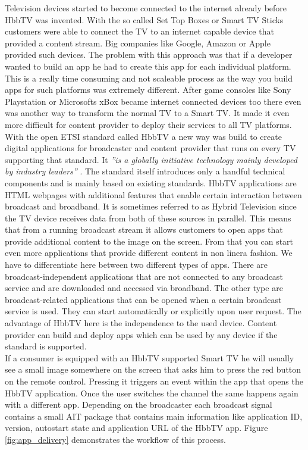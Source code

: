 Television devices started to become connected to the internet already before HbbTV was invented. With
the so called Set Top Boxes or Smart TV Sticks customers were able to connect the TV to an internet
capable device that provided a content stream. Big companies like Google, Amazon or Apple provided such
devices. The problem with this approach was that if a developer wanted to build an app he had to create
this app for each individual platform. This is a really time consuming and not scaleable process as
the way you build apps for such platforms was extremely different. After game consoles like Sony Playstation
or Microsofts xBox became internet connected devices too there even was another way to transform
the normal TV to a Smart TV. It made it even more difficult for content provider to deploy their services
to all TV platforms.\\
With the open ETSI standard called HbbTV a new way was build to create digital applications for
broadcaster and content provider that runs on every TV supporting that standard. It \textit{''is
a globally initiative technology mainly developed by industry leaders''} \cite{zte}. The standard
itself introduces only a handful technical components and is mainly based on existing standards. HbbTV
applications are HTML webpages with additional features that enable certain interaction between
broadcast and broadband. It is sometimes referred to as Hybrid Television since the TV device receives
data from both of these sources in parallel. This means that from a running broadcast stream it allows
customers to open apps that provide additional content to the image on the screen. From that you can start
even more applications that provide different content in non linera fashion. We have to differentiate
here between two different types of apps. There are broadcast-independent applications that are not
connected to any broadcast service and are downloaded and accessed via broadband. The other type are
broadcast-related applications that can be opened when a certain broadcast service is used. They
can start automatically or explicitly upon user request. The advantage of HbbTV here is the independence
to the used device. Content provider can build and deploy apps which can be used by any device if the
standard is supported.\\
If a consumer is equipped with an HbbTV supported Smart TV he will usually see a small image somewhere
on the screen that asks him to press the red button on the remote control. Pressing it triggers an
event within the app that opens the HbbTV application. Once the user switches the channel the same
happens again with a different app. Depending on the broadcaster each broadcast signal contains
a small AIT package that contains main information like application ID, version, autostart state and
application URL of the HbbTV app. Figure \ref{fig:app_delivery} demonstrates the workflow of this
process.

